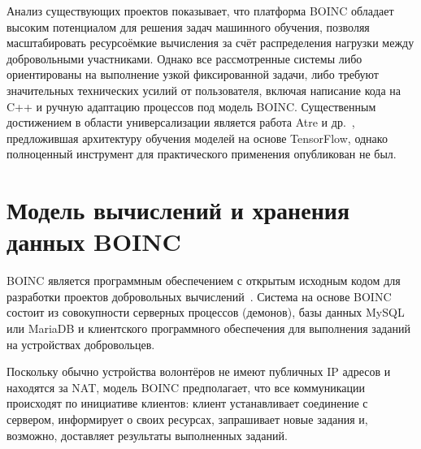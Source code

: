 \documentclass[a4paper,12pt]{extarticle}
\begin{document}
Анализ существующих проектов показывает, что платформа BOINC обладает высоким потенциалом для решения задач машинного обучения, позволяя масштабировать ресурсоёмкие вычисления за счёт распределения нагрузки между добровольными участниками.
Однако все рассмотренные системы либо ориентированы на выполнение узкой фиксированной задачи, либо требуют значительных технических усилий от пользователя, включая написание кода на C++ и ручную адаптацию процессов под модель BOINC.
Существенным достижением в области универсализации является работа Atre и др.~\cite{atre2021distributed}, предложившая архитектуру обучения моделей на основе TensorFlow, однако полноценный инструмент для практического применения опубликован не был.

\section{Модель вычислений и хранения данных BOINC}\label{sec:boinc}

BOINC является программным обеспечением с открытым исходным кодом для разработки проектов добровольных вычислений~\cite{anderson2004boinc,anderson2020boinc}.
Система на основе BOINC состоит из совокупности серверных процессов (демонов), базы данных MySQL или MariaDB и клиентского программного обеспечения для выполнения заданий на устройствах добровольцев.

Поскольку обычно устройства волонтёров не имеют публичных IP адресов и находятся за NAT, модель BOINC предполагает, что все коммуникации происходят по инициативе клиентов: клиент устанавливает соединение с сервером, информирует о своих ресурсах, запрашивает новые задания и, возможно, доставляет результаты выполненных заданий.
\end{document}
